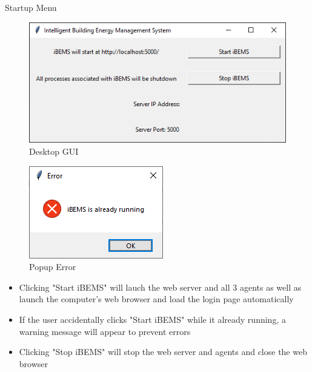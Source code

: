 \documentclass{beamer}
\begin{document}
\begin{frame}{Startup Menu}
    \begin{multicols}{2}
        \begin{figure}
            \centering
            \includegraphics[scale=0.4]{figs/bemsGUI.png}
            \caption{Desktop GUI}
            \label{fig:desktopgui}
        \end{figure}
        \begin{figure}
            \centering
            \includegraphics[scale=0.5]{figs/bemsGUIError.png}
            \caption{Popup Error}
            \label{fig:popuperror}
        \end{figure}
    \end{multicols}
    \begin{itemize}
        \item Clicking "Start iBEMS" will lauch the web server and all 3 agents as well as launch the computer's web browser and load the login page automatically
        \item If the user accidentally clicks "Start iBEMS" while it already running, a warning message will appear to prevent errors
        \item Clicking "Stop iBEMS" will stop the web server and agents and close the web browser
    \end{itemize}
\end{frame}
\end{document}
